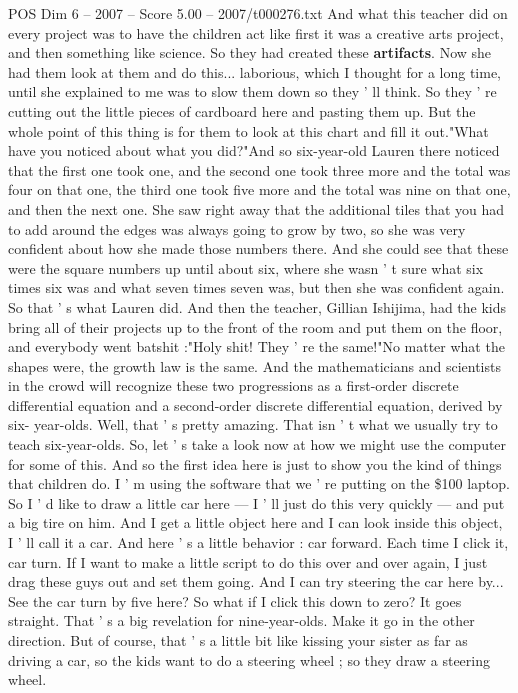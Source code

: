 \begin{textsample}{POS Dim 6 – 2007 – Score 5.00 – 2007/t000276.txt}
And what this teacher did on every project was to have the children act like first it was a creative arts project, and then something like science.
So they had created these \textbf{artifacts}.
Now she had them look at them and do this... laborious, which I thought for a long time, until she explained to me was to slow them down so they ' ll think.
So they ' re cutting out the little pieces of cardboard here and pasting them up.
But the whole point of this thing is for them to look at this chart and fill it out."What have you noticed about what you did?"And so six-year-old Lauren there noticed that the first one took one, and the second one took three more and the total was four on that one, the third one took five more and the total was nine on that one, and then the next one.
She saw right away that the additional tiles that you had to add around the edges was always going to grow by two, so she was very confident about how she made those numbers there.
And she could see that these were the square numbers up until about six, where she wasn ' t sure what six times six was and what seven times seven was, but then she was confident again.
So that ' s what Lauren did.
And then the teacher, Gillian Ishijima, had the kids bring all of their projects up to the front of the room and put them on the floor, and everybody went batshit :"Holy shit!
They ' re the same!"No matter what the shapes were, the growth law is the same.
And the mathematicians and scientists in the crowd will recognize these two progressions as a first-order discrete differential equation and a second-order discrete differential equation, derived by six- year-olds.
Well, that ' s pretty amazing.
That isn ' t what we usually try to teach six-year-olds.
So, let ' s take a look now at how we might use the computer for some of this.
And so the first idea here is just to show you the kind of things that children do.
I ' m using the software that we ' re putting on the \$100 laptop.
So I ' d like to draw a little car here — I ' ll just do this very quickly — and put a big tire on him.
And I get a little object here and I can look inside this object, I ' ll call it a car.
And here ' s a little behavior : car forward.
Each time I click it, car turn.
If I want to make a little script to do this over and over again, I just drag these guys out and set them going.
And I can try steering the car here by...
See the car turn by five here?
So what if I click this down to zero?
It goes straight.
That ' s a big revelation for nine-year-olds.
Make it go in the other direction.
But of course, that ' s a little bit like kissing your sister as far as driving a car, so the kids want to do a steering wheel ; so they draw a steering wheel.

\end{textsample}
